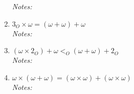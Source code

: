 \documentclass[justified]{tufte-handout}
\begin{document}
\begin{enumerate}[label=\roman*.]
\noindent \emph{Notes:}  \underline{\hspace{15.4cm}}\\

\item $3_O\times\omega=(\omega+\omega)+\omega$\\

\noindent \emph{Notes:}  \underline{\hspace{15.4cm}}\\

\item $(\omega\times 2_O)+\omega<_O(\omega+\omega)+2_O$\\

\noindent \emph{Notes:}  \underline{\hspace{15.4cm}}\\

\item $\omega\times(\omega+\omega)=(\omega\times\omega)+(\omega\times\omega)$\\

\noindent \emph{Notes:}  \underline{\hspace{15.4cm}}\\
\end{enumerate}
\end{document}
